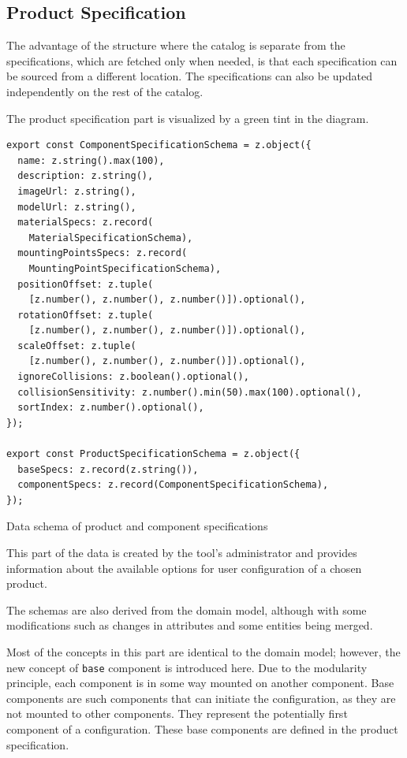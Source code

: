\subsection{Product Specification}

The advantage of the structure where the catalog is separate from the specifications, which are fetched only when needed, is that each specification can be sourced from a different location. The specifications can also be updated independently on the rest of the catalog.

The product specification part is visualized by a green tint in the  diagram.  

\begin{listing}[h]
\begin{verbatim}
export const ComponentSpecificationSchema = z.object({
  name: z.string().max(100),
  description: z.string(),
  imageUrl: z.string(),
  modelUrl: z.string(),
  materialSpecs: z.record(
    MaterialSpecificationSchema),
  mountingPointsSpecs: z.record(
    MountingPointSpecificationSchema),
  positionOffset: z.tuple(
    [z.number(), z.number(), z.number()]).optional(),
  rotationOffset: z.tuple(
    [z.number(), z.number(), z.number()]).optional(),
  scaleOffset: z.tuple(
    [z.number(), z.number(), z.number()]).optional(),
  ignoreCollisions: z.boolean().optional(),
  collisionSensitivity: z.number().min(50).max(100).optional(),
  sortIndex: z.number().optional(),
});

export const ProductSpecificationSchema = z.object({
  baseSpecs: z.record(z.string()),
  componentSpecs: z.record(ComponentSpecificationSchema),
});
\end{verbatim}
\caption{Data schema of product and component specifications}
\label{lisiting:schema-componentspecification}
\end{listing}

This part of the data is created by the tool's administrator and provides information about the available options for user configuration of a chosen product.

The schemas are also derived from the domain model, although with some modifications such as changes in attributes and some entities being merged.

Most of the concepts in this part are identical to the domain model; however, the new concept of \texttt{base} component is introduced here. Due to the modularity principle, each component is in some way mounted on another component. Base components are such components that can initiate the configuration, as they are not mounted to other components. They represent the potentially first component of a configuration. These base components are defined in the product specification.

